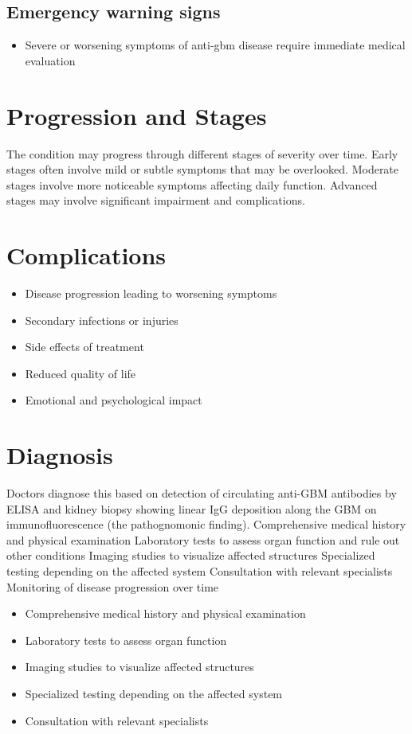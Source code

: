 \subsection{Emergency warning signs}
\begin{itemize}[noitemsep]
  \item Severe or worsening symptoms of anti-gbm disease require immediate medical evaluation
\end{itemize}
\section{Progression and Stages}
The condition may progress through different stages of severity over time. Early stages often involve mild or subtle symptoms that may be overlooked. Moderate stages involve more noticeable symptoms affecting daily function. Advanced stages may involve significant impairment and complications.
\section{Complications}
\begin{itemize}[noitemsep]
  \item Disease progression leading to worsening symptoms
  \item Secondary infections or injuries
  \item Side effects of treatment
  \item Reduced quality of life
  \item Emotional and psychological impact
\end{itemize}
\section{Diagnosis}
Doctors diagnose this based on detection of circulating anti-GBM antibodies by ELISA and kidney biopsy showing linear IgG deposition along the GBM on immunofluorescence (the pathognomonic finding). Comprehensive medical history and physical examination Laboratory tests to assess organ function and rule out other conditions Imaging studies to visualize affected structures Specialized testing depending on the affected system Consultation with relevant specialists Monitoring of disease progression over time

\begin{itemize}[noitemsep]
  \item Comprehensive medical history and physical examination
  \item Laboratory tests to assess organ function
  \item Imaging studies to visualize affected structures
  \item Specialized testing depending on the affected system
  \item Consultation with relevant specialists
\end{itemize}
